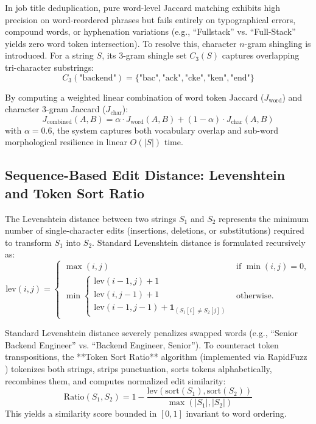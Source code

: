 In job title deduplication, pure word-level Jaccard matching exhibits high precision on word-reordered phrases but fails entirely on typographical errors, compound words, or hyphenation variations (e.g., ``Fullstack'' vs. ``Full-Stack'' yields zero word token intersection). To resolve this, character $n$-gram shingling \cite{broder1997syntactic} is introduced. For a string $S$, its 3-gram shingle set $C_3(S)$ captures overlapping tri-character substrings:
\begin{equation}
    C_3(\text{"backend"}) = \{\text{"bac"}, \text{"ack"}, \text{"cke"}, \text{"ken"}, \text{"end"}\}
\end{equation}

By computing a weighted linear combination of word token Jaccard ($J_{\text{word}}$) and character 3-gram Jaccard ($J_{\text{char}}$):
\begin{equation}
    J_{\text{combined}}(A, B) = \alpha \cdot J_{\text{word}}(A, B) + (1 - \alpha) \cdot J_{\text{char}}(A, B)
\end{equation}
with $\alpha = 0.6$, the system captures both vocabulary overlap and sub-word morphological resilience in linear $O(|S|)$ time.

\subsection{Sequence-Based Edit Distance: Levenshtein and Token Sort Ratio}
The Levenshtein distance \cite{levenshtein1966binary} between two strings $S_1$ and $S_2$ represents the minimum number of single-character edits (insertions, deletions, or substitutions) required to transform $S_1$ into $S_2$. Standard Levenshtein distance is formulated recursively as:
\begin{equation}
    \text{lev}(i, j) = \begin{cases}
        \max(i, j) & \text{if } \min(i, j) = 0, \\
        \min \begin{cases}
            \text{lev}(i-1, j) + 1 \\
            \text{lev}(i, j-1) + 1 \\
            \text{lev}(i-1, j-1) + \mathbf{1}_{(S_1[i] \neq S_2[j])}
        \end{cases} & \text{otherwise.}
    \end{cases}
\end{equation}

Standard Levenshtein distance severely penalizes swapped words (e.g., ``Senior Backend Engineer'' vs. ``Backend Engineer, Senior''). To counteract token transpositions, the **Token Sort Ratio** algorithm (implemented via RapidFuzz \cite{rapidfuzz}) tokenizes both strings, strips punctuation, sorts tokens alphabetically, recombines them, and computes normalized edit similarity:
\begin{equation}
    \text{Ratio}(S_1, S_2) = 1 - \frac{\text{lev}(\text{sort}(S_1), \text{sort}(S_2))}{\max(|S_1|, |S_2|)}
\end{equation}
This yields a similarity score bounded in $[0, 1]$ invariant to word ordering.

